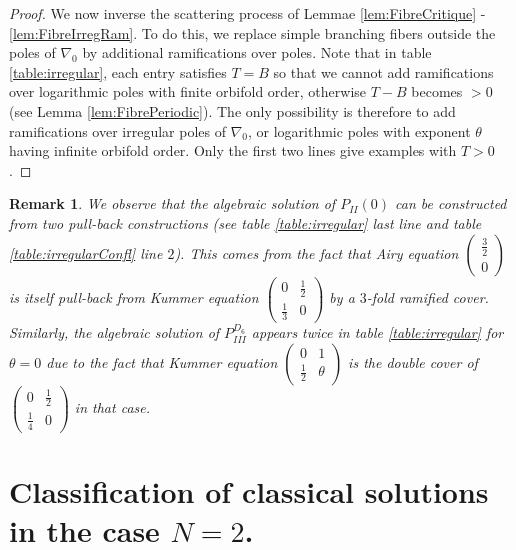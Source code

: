 \documentclass[12]{amsart}
\newtheorem{remark}[thm]{Remark}
\begin{document}
\begin{proof}We now inverse the scattering process of Lemmae  \ref{lem:FibreCritique} - \ref{lem:FibreIrregRam}.
To do this, we replace simple branching fibers outside the poles of $\nabla_0$ by additional ramifications
over poles. Note that in table \ref{table:irregular}, each entry satisfies $T=B$ so that we cannot add ramifications
over logarithmic poles with finite orbifold order, otherwise $T-B$ becomes $>0$ (see Lemma \ref{lem:FibrePeriodic}).
The only possibility is therefore to add ramifications over irregular poles of $\nabla_0$, or logarithmic poles 
with exponent $\theta$ having infinite orbifold order. Only the first two lines give examples with $T>0$.
\end{proof}

\begin{remark}We observe that the algebraic solution of $P_{II}(0)$ can be constructed from 
two pull-back constructions (see table \ref{table:irregular} last line and table \ref{table:irregularConfl} line $2$).
This comes from the fact that Airy equation $\begin{pmatrix}\frac{3}{2}\\  0\end{pmatrix}$ is itself pull-back
from Kummer equation $\begin{pmatrix}0& \frac{1}{2}\\ \frac{1}{3} & 0\end{pmatrix}$ by a $3$-fold ramified cover.
Similarly, the algebraic solution of $P_{III}^{D_6}$ appears twice in table \ref{table:irregular} for $\theta=0$
due to the fact 
that Kummer equation $\begin{pmatrix}0& 1\\ \frac{1}{2} & \theta\end{pmatrix}$ is the double cover
of $\begin{pmatrix}0& \frac{1}{2}\\ \frac{1}{4} & 0\end{pmatrix}$ in that case.
\end{remark}



\section{Classification of classical solutions in the case $N=2$.}\label{sec:ClassicalN=2}
\end{document}
